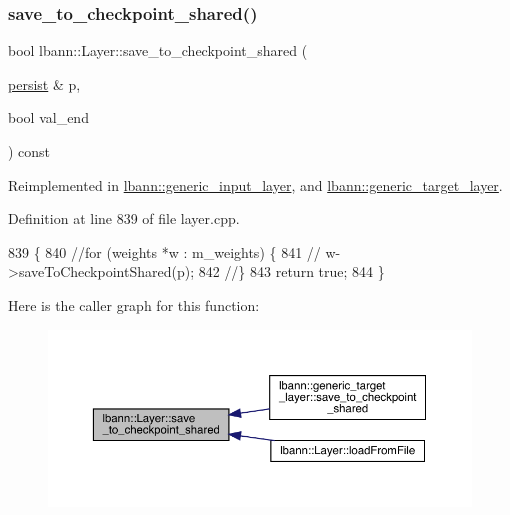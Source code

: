 \subsubsection{\texorpdfstring{save\+\_\+to\+\_\+checkpoint\+\_\+shared()}{save\_to\_checkpoint\_shared()}}
{\footnotesize\ttfamily bool lbann\+::\+Layer\+::save\+\_\+to\+\_\+checkpoint\+\_\+shared (\begin{DoxyParamCaption}\item[{\hyperlink{classlbann_1_1persist}{persist} \&}]{p,  }\item[{bool}]{val\+\_\+end }\end{DoxyParamCaption}) const\hspace{0.3cm}{\ttfamily [virtual]}}



Reimplemented in \hyperlink{classlbann_1_1generic__input__layer_abae61e13f47205491a43e4842808945d}{lbann\+::generic\+\_\+input\+\_\+layer}, and \hyperlink{classlbann_1_1generic__target__layer_a10a0cd1cc77c97e62f14a77ff380559a}{lbann\+::generic\+\_\+target\+\_\+layer}.



Definition at line 839 of file layer.\+cpp.


\begin{DoxyCode}
839                                                                     \{
840   \textcolor{comment}{//for (weights *w : m\_weights) \{}
841   \textcolor{comment}{//  w->saveToCheckpointShared(p);  }
842   \textcolor{comment}{//\}}
843   \textcolor{keywordflow}{return} \textcolor{keyword}{true};
844 \}
\end{DoxyCode}
Here is the caller graph for this function\+:\nopagebreak
\begin{figure}[H]
\begin{center}
\leavevmode
\includegraphics[width=350pt]{classlbann_1_1Layer_afce0efa0f1c8f3b1c61069536b2fa8cc_icgraph}
\end{center}
\end{figure}
\mbox{\label{classlbann_1_1Layer_a994a4beabbace598193b1611eb06b07e}} 

